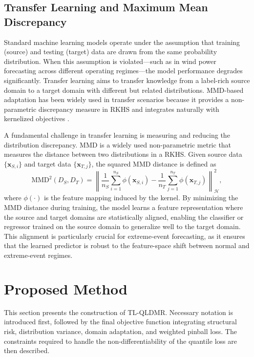 \documentclass[a4paper]{cas-sc}
\begin{document}
\subsection{Transfer Learning and Maximum Mean Discrepancy}
Standard machine learning models operate under the assumption that training (source) and testing (target) data are drawn from the same probability distribution. When this assumption is violated---such as in wind power forecasting across different operating regimes---the model performance degrades significantly. Transfer learning aims to transfer knowledge from a label-rich source domain to a target domain with different but related distributions.
MMD-based adaptation has been widely used in transfer scenarios because it provides a non-parametric discrepancy measure in RKHS and integrates naturally with kernelized objectives \citep{TAO20123962, YAN2022107664, GUO2022118237, dp2, ss2}.

A fundamental challenge in transfer learning is measuring and reducing the distribution discrepancy. MMD is a widely used non-parametric metric that measures the distance between two distributions in a RKHS. Given source data $\{\boldsymbol{x}_{S,i}\}$ and target data $\{\boldsymbol{x}_{T,j}\}$, the squared MMD distance is defined as
\begin{equation}
\text{MMD}^2(D_S, D_T) = \left\| \frac{1}{n_S} \sum_{i=1}^{n_S} \phi(\boldsymbol{x}_{S,i}) - \frac{1}{n_T} \sum_{j=1}^{n_T} \phi(\boldsymbol{x}_{T,j}) \right\|_{\mathcal{H}}^2 ,
\end{equation}
where $\phi(\cdot)$ is the feature mapping induced by the kernel. By minimizing the MMD distance during training, the model learns a feature representation where the source and target domains are statistically aligned, enabling the classifier or regressor trained on the source domain to generalize well to the target domain. This alignment is particularly crucial for extreme-event forecasting, as it ensures that the learned predictor is robust to the feature-space shift between normal and extreme-event regimes.


\section{Proposed Method}\label{novel}
This section presents the construction of TL-QLDMR. Necessary notation is introduced first, followed by the final objective function integrating structural risk, distribution variance, domain adaptation, and weighted pinball loss. The constraints required to handle the non-differentiability of the quantile loss are then described.
\end{document}
